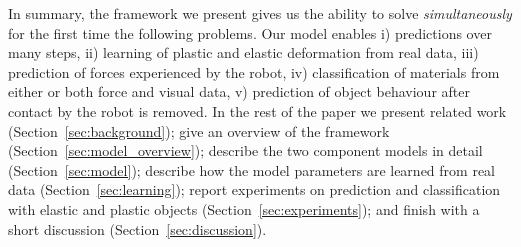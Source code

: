 \documentclass[journal]{IEEEtran}
\newcommand{\alref}[1]{Algorithm~\ref{#1}}
\newcounter{algorithm}
\newenvironment{algorithmicieee}[1]
  {\refstepcounter{algorithm}
   \begin{lrbox}{\ieeealgbox}
   \begin{minipage}{\dimexpr\columnwidth-2\fboxsep-2\fboxrule}
   \textbf{Algorithm \arabic{algorithm}:} \textit{#1} \par
   \begin{algorithmic}[1]}
  {\end{algorithmic}
   \end{minipage}
   \end{lrbox}\noindent\fbox{\usebox{\ieeealgbox}}}
\newcommand{\comment}[1]{{\color{red} #1}}
\begin{document}


In summary, the framework we present gives us the ability to solve {\em simultaneously} for the first time the following problems. Our model enables i) predictions over many steps, ii) learning of plastic and elastic deformation from real data, iii) prediction of forces experienced by the robot, iv) classification of materials from either or both force and visual data, v) prediction of object behaviour after contact by the robot is removed. In the rest of the paper we present related work (Section~\ref{sec:background}); \comment{give an overview of the framework (Section~\ref{sec:model_overview});} describe the two component models in detail (Section~\ref{sec:model}); describe how the model parameters are learned from real data (Section~\ref{sec:learning}); report experiments on prediction and classification with elastic and plastic objects (Section~\ref{sec:experiments}); and finish with a short discussion (Section~\ref{sec:discussion}).
\end{document}
